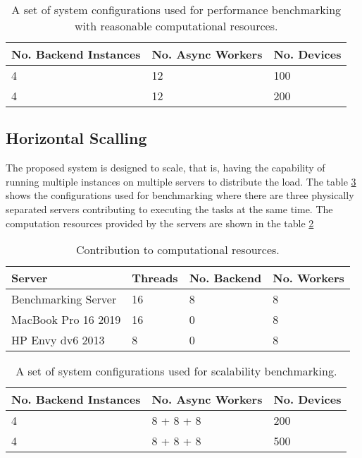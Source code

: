 \documentclass[../thesis.tex]{subfiles}
\begin{document}
\begin{table}[h!]
	\begin{center}
		\caption{A set of system configurations used for performance benchmarking with reasonable computational resources.}
		\label{tab:highsysconfbench}
		\begin{tabular}{l|l|l}
			\toprule
			\textbf{No. Backend Instances} & \textbf{No. Async Workers} & \textbf{No. Devices}\\
			\midrule
			4 & 12 & 100\\
			4 & 12 & 200\\
			\bottomrule
		\end{tabular}
	\end{center}
\end{table}

\subsection{Horizontal Scalling}

The proposed system is designed to scale, that is, having the capability of running multiple instances on multiple servers to distribute the load. The table \ref{tab:scalebench} shows the configurations used for benchmarking where there are three physically separated servers contributing to executing the tasks at the same time. The computation resources provided by the servers are shown in the table \ref{tab:computecontrib}

\begin{table}[h!]
	\begin{center}
		\caption{Contribution to computational resources.}
		\label{tab:computecontrib}
		\begin{tabular}{l|l|l|l}
			\toprule
			\textbf{Server} & \textbf{Threads} & \textbf{No. Backend} & \textbf{No. Workers}\\
			\midrule
			Benchmarking Server & 16 & 8 & 8\\
			MacBook Pro 16 2019 & 16 & 0 & 8\\
			HP Envy dv6 2013 & 8 & 0 & 8\\
			\bottomrule
		\end{tabular}
	\end{center}
\end{table}

\begin{table}[h!]
	\begin{center}
		\caption{A set of system configurations used for scalability benchmarking.}
		\label{tab:scalebench}
		\begin{tabular}{l|l|l}
			\toprule
			\textbf{No. Backend Instances} & \textbf{No. Async Workers} & \textbf{No. Devices}\\
			\midrule
			4 & 8 + 8 + 8 & 200\\
			4 & 8 + 8 + 8 & 500\\
			\bottomrule
		\end{tabular}
	\end{center}
\end{table}
\end{document}
